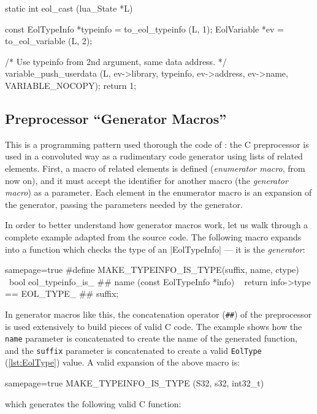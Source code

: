 \begin{ccode}
static int
eol_cast (lua_State *L) {
  const EolTypeInfo *typeinfo = to_eol_typeinfo (L, 1);
  EolVariable *ev = to_eol_variable (L, 2);

  /* Use typeinfo from 2nd argument, same data address. */
  variable_push_userdata (L, ev->library, typeinfo,
    ev->address, ev->name, VARIABLE_NOCOPY);
  return 1;
}
\end{ccode}


\subsection{Preprocessor “Generator Macros”}
  \label{sec:cpp-abuse-genmacros}

This is a programming pattern used thorough the code of \Eol*: the
C preprocessor is used in a convoluted way as a rudimentary code generator
using lists of related elements. First, a macro of related elements is defined
(\emph{enumerator macro}, from now on), and it must accept the identifier for
another macro (the \emph{generator macro}) as a parameter. Each element in the
enumerator macro is an expansion of the generator, passing the parameters
needed by the generator.

In order to better understand how generator macros work, let us walk through
a complete example adapted from the \Eol* source code. The following macro
expands into a function which checks the type of an \Mc|EolTypeInfo| — it is
the \emph{generator}:

\begin{ccode*}{samepage=true}
#define MAKE_TYPEINFO_IS_TYPE(suffix, name, ctype)            \
    bool eol_typeinfo_is_ ## name (const EolTypeInfo *înfo) \
    { return info->type == EOL_TYPE_ ## suffix; }
\end{ccode*}

\noindent In generator macros like this, the concatenation operator
(\verb|##|) of the preprocessor is used extensively to build pieces of valid
C code. The example shows how the \verb|name| parameter is concatenated to
create the name of the generated function, and the \verb|suffix| parameter is
concatenated to create a valid \verb|EolType| (\autoref{lst:EolType})
value. A valid expansion of the above macro is:

\begin{ccode*}{samepage=true}
MAKE_TYPEINFO_IS_TYPE (S32, s32, int32_t)
\end{ccode*}

\noindent
which generates the following valid C function:

